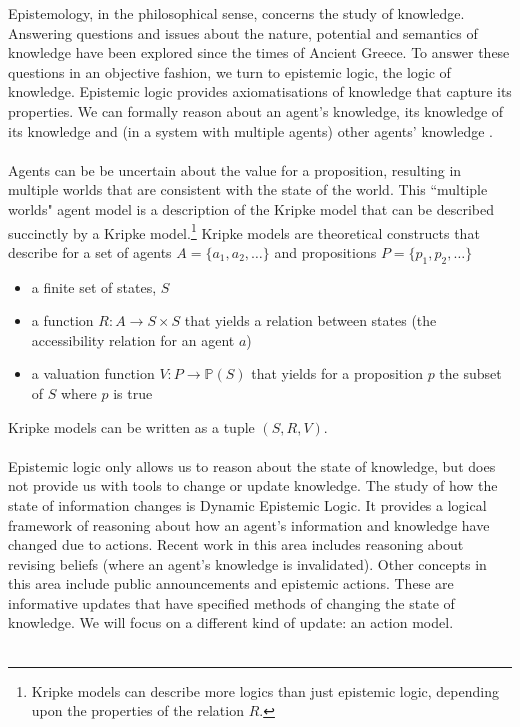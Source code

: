 Epistemology, in the philosophical sense, concerns the study of knowledge.
Answering questions and issues about the nature, potential and semantics of knowledge have been explored since the times of Ancient Greece.
To answer these questions in an objective fashion, we turn to epistemic logic, the logic of knowledge.
Epistemic logic provides axiomatisations of knowledge that capture its properties.
We can formally reason about an agent's knowledge, its knowledge of its knowledge and (in a system
with multiple agents) other agents' knowledge \cite{hoek2008dynamic}.\\
\\
Agents can be be uncertain about the value for a proposition, resulting in multiple worlds that are consistent with the state of the world.
This ``multiple worlds" agent model is a description of the Kripke model that can be described succinctly by a Kripke model.\footnote{Kripke models can describe more logics than just epistemic logic, depending upon the properties of the relation $R$.}
Kripke models are theoretical constructs that describe for a set of agents $A = \{a_1, a_2, \ldots\}$ and propositions $P = \{p_1, p_2, \ldots \}$
\begin{itemize}
  \item a finite set of states, $S$
  \item a function $R: A \to S \times S$ that yields a relation between states (the accessibility relation for an agent $a$)
  \item a valuation function $V: P \to \mathbb{P}(S)$ that yields for a proposition $p$ the subset of $S$ where $p$ is true
\end{itemize}
Kripke models can be written as a tuple $(S, R, V)$.\\
\\
Epistemic logic only allows us to reason about the state of knowledge, but does not provide us with tools to change or update knowledge.
The study of how the state of information changes is Dynamic Epistemic Logic.
It provides a logical framework of reasoning about how an agent's information and knowledge have changed due to actions.
Recent work in this area includes reasoning about revising beliefs (where an agent's knowledge is invalidated).
Other concepts in this area include public announcements and epistemic actions.
These are informative updates that have specified methods of changing the state of knowledge.
We will focus on a different kind of update: an action model.\\
\\
